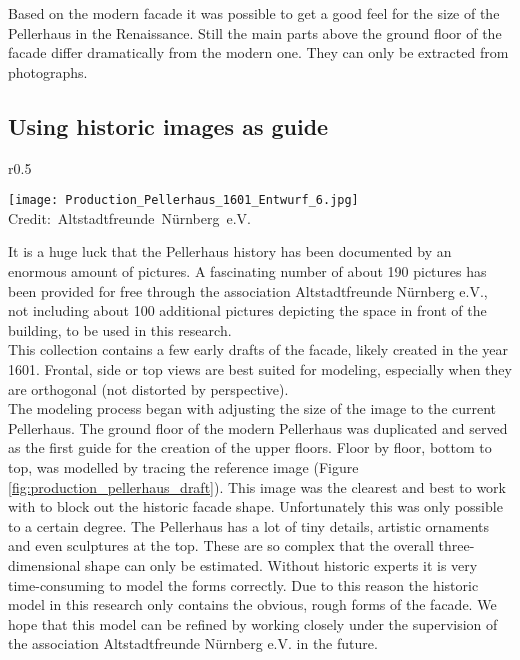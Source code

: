 Based on the modern facade it was possible to get a good feel for the size of the Pellerhaus in the Renaissance. Still the main parts above the ground floor of the facade differ dramatically from the modern one. They can only be extracted from photographs.


\subsection{Using historic images as guide}

\begin{wrapfigure}{r}{0.5\textwidth}
	
	\centering
	
	\texttt{[image: Production\_Pellerhaus\_1601\_Entwurf\_6.jpg]}
	\hbox{\scriptsize Credit: Altstadtfreunde Nürnberg e.V.}
	\caption{Early draft of the Pellerhaus facade of around 1601}
	\label{fig:production_pellerhaus_draft}
	\vspace{-10pt}
	
\end{wrapfigure}

It is a huge luck that the Pellerhaus history has been documented by an enormous amount of pictures. A fascinating number of about 190 pictures has been provided for free through the association Altstadtfreunde Nürnberg e.V., not including about 100 additional pictures depicting the space in front of the building, to be used in this research.\\

This collection contains a few early drafts of the facade, likely created in the year 1601. Frontal, side or top views are best suited for modeling, especially when they are orthogonal (not distorted by perspective).\\

The modeling process began with adjusting the size of the image to the current Pellerhaus. The ground floor of the modern Pellerhaus was duplicated and served as the first guide for the creation of the upper floors. Floor by floor, bottom to top, was modelled by tracing the reference image (Figure \ref{fig:production_pellerhaus_draft}). This image was the clearest and best to work with to block out the historic facade shape. Unfortunately this was only possible to a certain degree. The Pellerhaus has a lot of tiny details, artistic ornaments and even sculptures at the top. These are so complex that the overall three-dimensional shape can only be estimated. Without historic experts it is very time-consuming to model the forms correctly. Due to this reason the historic model in this research only contains the obvious, rough forms of the facade. We hope that this model can be refined by working closely under the supervision of the association Altstadtfreunde Nürnberg e.V. in the future.

